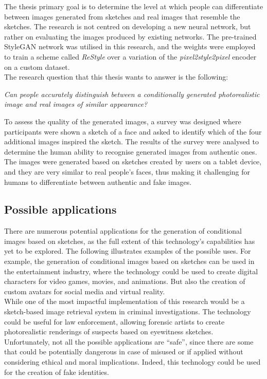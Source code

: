 \noindent The thesis primary goal is to determine the level at which people can differentiate between images generated from sketches and real images that resemble the sketches. The research is not centred on developing a new neural network, but rather on evaluating the images produced by existing networks. The pre-trained StyleGAN network was utilised in this research, and the weights were employed to train a scheme called \textit{ReStyle} over a variation of the \textit{pixel2style2pixel} encoder on a custom dataset. \\
The research question that this thesis wants to answer is the following:
\begin{center}
    \textit{Can people accurately distinguish between a conditionally generated photorealistic image and real images of similar appearance?}
\end{center}

\noindent To assess the quality of the generated images, a survey was designed where participants were shown a sketch of a face and asked to identify which of the four additional images inspired the sketch. The results of the survey were analysed to determine the human ability to recognise generated images from authentic ones.
The images were generated based on sketches created by users on a tablet device, and they are very similar to real people's faces, thus making it challenging for humans to differentiate between authentic and fake images.

\subsection{Possible applications}
There are numerous potential applications for the generation of conditional images based on sketches, as the full extent of this technology's capabilities has yet to be explored. The following illustrates examples of the possible uses. For example, the generation of conditional images based on sketches can be used in the entertainment industry, where the technology could be used to create digital characters for video games, movies, and animations. But also the creation of custom avatars for social media and virtual reality.
\\
While one of the most impactful implementation of this research would be a sketch-based image retrieval system in criminal investigations. The technology could be useful for law enforcement, allowing forensic artists to create photorealistic renderings of suspects based on eyewitness sketches. \\
Unfortunately, not all the possible applications are “safe”, since there are some that could be potentially dangerous in case of misused or if applied without considering ethical and moral implications. Indeed, this technology could be used for the creation of fake identities.

